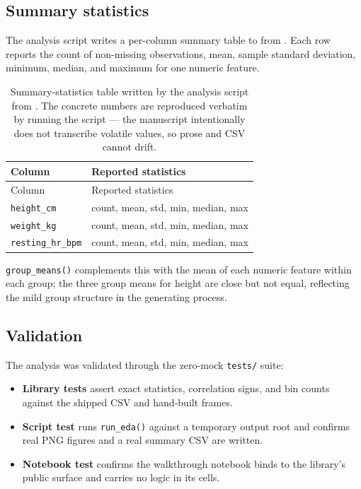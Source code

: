 \documentclass[
  english,
]{article}
\providecommand{\tightlist}{%
  \setlength{\itemsep}{0pt}\setlength{\parskip}{0pt}}
\begin{document}
\subsection{Summary statistics}\label{summary-statistics}

The analysis script writes a per-column summary table to
 from
. Each row reports the count of
non-missing observations, mean, sample standard deviation, minimum,
median, and maximum for one numeric feature.

\begin{longtable}[]{@{}ll@{}}
\caption{Summary-statistics table written by the analysis script from
\protect{}. The
concrete numbers are reproduced verbatim by running the script --- the
manuscript intentionally does not transcribe volatile values, so prose
and CSV cannot drift.}\label{tbl:summary_statistics}\tabularnewline
\toprule\noalign{}
Column & Reported statistics \\
\midrule\noalign{}
\endfirsthead
\toprule\noalign{}
Column & Reported statistics \\
\midrule\noalign{}
\endhead
\bottomrule\noalign{}
\endlastfoot
\texttt{height\_cm} & count, mean, std, min, median, max \\
\texttt{weight\_kg} & count, mean, std, min, median, max \\
\texttt{resting\_hr\_bpm} & count, mean, std, min, median, max \\
\end{longtable}

\texttt{group\_means()} complements this with the mean of each numeric
feature within each group; the three group means for height are close
but not equal, reflecting the mild group structure in the generating
process.

\subsection{Validation}\label{validation}

The analysis was validated through the zero-mock \texttt{tests/} suite:

\begin{itemize}
\tightlist
\item
  \textbf{Library tests} assert exact statistics, correlation signs, and
  bin counts against the shipped CSV and hand-built frames.
\item
  \textbf{Script test} runs \texttt{run\_eda()} against a temporary
  output root and confirms real PNG figures and a real summary CSV are
  written.
\item
  \textbf{Notebook test} confirms the walkthrough notebook binds to the
  library's public surface and carries no logic in its cells.
\end{itemize}
\end{document}

